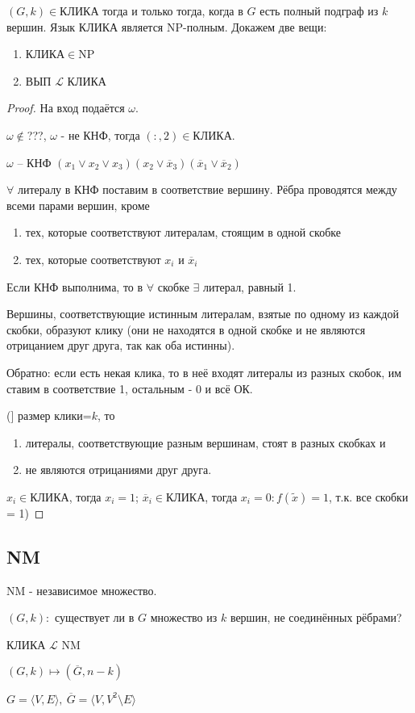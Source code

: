 \documentclass[final]{report}
\newcommand{\w}{\omega}
\newcommand{\nx}{\overline{x}}
\newcommand{\F}{\ensuremath{\forall}}
\newcommand{\E}{\ensuremath{\exists}}
\theoremstyle {remark}
\theoremstyle {remark}
\newcommand{\nx}{\overline{x}}
\renewcommand{\ss}[1]
{
\phantomsection
\subsection*{#1}
\addcontentsline{toc}{subsection}{#1}
}
\begin{document}
$(G,k)\in$КЛИКА тогда и только тогда, когда в $G$ есть полный подграф из $k$ вершин.
{\theor Язык КЛИКА является NP-полным.}
Докажем две вещи:
\begin{enumerate}
	\item КЛИКА$\in$NP
	\item ВЫП $\mathcal{L}$ КЛИКА
\end{enumerate}
\begin{proof}
На вход подаётся $\w$.

$\w\notin$???, $\w$ - не КНФ, тогда  $(:,2)\in$КЛИКА.

$\w$ -- КНФ $(x_1\lor x_2\lor x_3)(x_2\lor\nx_3)(\nx_1\lor\nx_2)$

$\forall$ литералу в КНФ поставим в соответствие вершину. Рёбра проводятся между всеми парами вершин, кроме
\begin{enumerate}
\item тех, которые соответствуют литералам, стоящим в одной скобке
\item тех, которые соответствуют $x_i$ и $\nx_i$
\end{enumerate}
Если КНФ выполнима, то в $\F$ скобке $\E$ литерал, равный 1.

Вершины, соответствующие истинным литералам, взятые по одному из каждой скобки, образуют клику (они не находятся в одной скобке и не являются отрицанием друг друга, так как оба истинны).

Обратно: если есть некая клика, то в неё входят литералы из разных скобок, им ставим в соответствие 1, остальным - 0 и всё ОК.

(] размер клики=$k$, то \begin{enumerate}
\item литералы, соответствующие разным вершинам, стоят в разных скобках и
\item не являются отрицаниями друг друга.
\end{enumerate}
$x_i\in$КЛИКА, тогда $x_i=1$; $\nx_i\in$КЛИКА, тогда $x_i=0\colon f(\tilde{x})=1$, т.к. все скобки = 1)
\end{proof}

\ss {NM}

NM - независимое множество.

$(G,k):$ существует ли в $G$ множество из $k$ вершин, не соединённых рёбрами?

КЛИКА $\mathcal{L}$ NM

$(G,k)\mapsto(\overline{G},n-k)$

$G=\langle V,E\rangle,\ \overline{G}=\langle V,V^2\setminus E\rangle$
\end{document}
